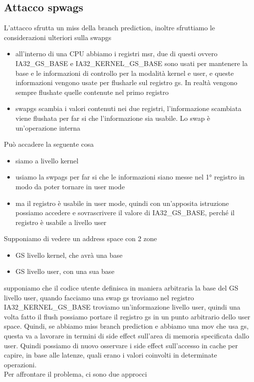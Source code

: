 \documentclass[12pt, oneside]{extbook}
\begin{document}
\subsection{Attacco spwags}
L'attacco sfrutta un miss della branch prediction, inoltre sfruttiamo le considerazioni ulteriori sulla swapgs
\begin{itemize}
\item all'interno di una CPU abbiamo i registri msr, due di questi ovvero IA32\_GS\_BASE e IA32\_KERNEL\_GS\_BASE sono usati per mantenere la base e le informazioni di controllo per la modalità kernel e user, e queste informazioni vengono usate per flusharle sul registro gs. In realtà vengono sempre flushate quelle contenute nel primo registro
\item swapgs scambia i valori contenuti nei due registri, l'informazione scambiata viene flushata per far si che l'informazione sia usabile. Lo swap è un'operazione interna
\end{itemize}
Può accadere la seguente cosa
\begin{itemize}
\item siamo a livello kernel
\item usiamo la swpags per far si che le informazioni siano messe nel 1° registro in modo da poter tornare in user mode
\item ma il registro è usabile in user mode, quindi con un'apposita istruzione possiamo accedere e sovrascrivere il valore di IA32\_GS\_BASE, perché il registro è usabile a livello user
\end{itemize}
Supponiamo di vedere un address space con 2 zone
\begin{itemize}
\item GS livello kernel, che avrà una base
\item GS livello user, con una sua base
\end{itemize}
supponiamo che il codice utente definisca in maniera arbitraria la base del GS livello user, quando facciamo una swap gs troviamo nel registro IA32\_KERNEL\_GS\_BASE troviamo un'informazione livello user, quindi una volta fatto il flush possiamo portare il registro gs in un punto arbitrario dello user space. Quindi, se abbiamo miss branch prediction e abbiamo una mov che usa gs, questa va a lavorare in termini di side effect sull'area di memoria specificata dallo user. Quindi possiamo di nuovo osservare i side effect sull'accesso in cache per capire, in base alle latenze, quali erano i valori coinvolti in determinate operazioni.\\ Per affrontare il problema, ci sono due approcci
\end{document}

